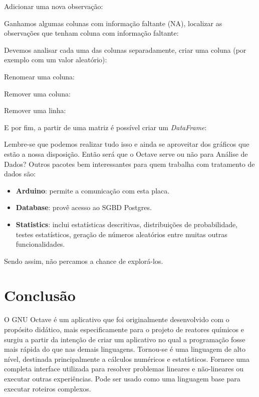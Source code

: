 \documentclass[a4paper,11pt]{article}
\begin{document}
Adicionar uma nova observação: \\

Ganhamos algumas colunas com informação faltante (NA), localizar as observações que tenham coluna com informação faltante: \\

Devemos analisar cada uma das colunas separadamente, criar uma coluna (por exemplo com um valor aleatório): \\

Renomear uma coluna: \\

Remover uma coluna: \\

Remover uma linha: \\

E por fim, a partir de uma matriz é possível criar um \textit{DataFrame}: \\

Lembre-se que podemos realizar tudo isso e ainda se aproveitar dos gráficos que estão a nossa disposição. Então será que o Octave serve ou não para Análise de Dados? Outros pacotes bem interessantes para quem trabalha com tratamento de dados são: \vspace{-1em}
\begin{itemize}
	\item \textbf{Arduino}: permite a comunicação com esta placa.
	\item \textbf{Database}: provê acesso ao SGBD Postgres.
	\item \textbf{Statistics}: inclui estatísticas descritivas, distribuições de probabilidade, testes estatísticos, geração de números aleatórios entre muitas outras funcionalidades.
\end{itemize}

Sendo assim, não percamos a chance de explorá-los.

\section{Conclusão}
O GNU Octave é um aplicativo que foi originalmente desenvolvido com o propósito didático, mais especificamente para o projeto de reatores químicos e surgiu a partir da intenção de criar um aplicativo no qual a programação fosse mais rápida do que nas demais linguagens. Tornou-se é uma linguagem de alto nível, destinada principalmente a cálculos numéricos e estatísticos. Fornece uma completa interface utilizada para resolver problemas lineares e não-lineares ou executar outras experiências. Pode ser usado como uma linguagem base para executar roteiros complexos.
\end{document}
